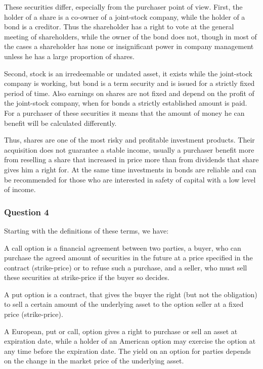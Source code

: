 \documentclass[a4paper,12pt]{article} %
\begin{document}
These securities differ, especially  from the purchaser point of view. First, the holder of a share is a co-owner of a joint-stock company, while the holder of a bond is a creditor. Thus the shareholder has a right to vote at the general meeting of shareholders, while the owner of the bond does not, 
 though in most of the cases a shareholder has none or insignificant power in company management unless he has a large proportion of shares.

Second, stock is an irredeemable or undated asset, it exists while the joint-stock company is working, but  bond is a term security and is issued for a strictly fixed period of time. Also earnings on shares are not fixed and depend on the profit of the joint-stock company, when for bonds  a strictly established amount is paid. For a purchaser of these securities it means that the amount of money he can benefit will be calculated differently.  
 
 Thus, shares are one of the most risky and profitable investment products. Their acquisition does not guarantee a stable income, usually a purchaser benefit more from reselling a share that increased in price more than from dividends that share gives him a right for. At the same time investments in bonds are reliable and can be recommended for those who are interested in safety of capital with a low level of income.
 


\subsubsection*{Question 4  }

Starting with the definitions of these terms,  we have:

A call option is a financial agreement between two parties, a buyer, who can purchase the agreed amount of securities in the future at a price specified in the contract (strike-price) or to refuse such a purchase,   and a seller, who must sell these securities at strike-price if the buyer so decides.

A put option is a contract, that gives the buyer the right (but not the obligation) to sell a certain amount of the underlying asset to the option seller at a fixed price (strike-price). 

A European, put or call, option  gives a right to purchase or sell an asset  
at expiration date,  while a holder of an American option may
exercise the option at any time before the expiration date. The yield on an option for parties  depends on the change in the market price of the underlying asset. 
\end{document}
